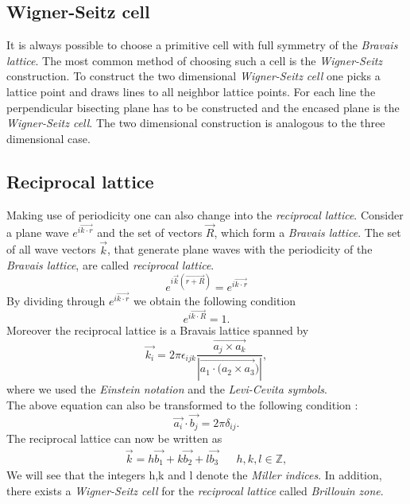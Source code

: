 		\subsection{Wigner-Seitz cell}
			It is always possible to choose a primitive cell with full symmetry of the \textit{Bravais lattice}. The most common method of choosing such a cell is the \textit{Wigner-Seitz} construction. To construct the two dimensional \textit{Wigner-Seitz cell} one picks a lattice point and draws lines to all neighbor lattice points. For each line the perpendicular bisecting plane has to be constructed and the encased plane is the \textit{Wigner-Seitz cell}. The two dimensional construction is analogous to the three dimensional case.			
			
		\subsection{Reciprocal lattice}
			\label{sec:reciprocalLattice}
			Making use of periodicity one can also change into the \textit{reciprocal lattice}. Consider a plane wave $e^{i\vec{k \cdot r}}$ and the set of vectors $\vec{R}$, which form a \textit{Bravais lattice}. The set of all wave vectors $\vec{k}$, that generate plane waves with the periodicity of the \textit{Bravais lattice}, are called \textit{reciprocal lattice}.
			\begin{equation}
				\label{eq:reciprocalLattice}
				e^{i\vec{k}(\vec{r + R})} = e^{i \vec{k \cdot r}}
			\end{equation}
			By dividing through $e^{i\vec{k \cdot r}}$ we obtain the following condition
			\begin{equation}
				e^{i\vec{k \cdot R}} = 1.
			\end{equation}
			Moreover the reciprocal lattice is a Bravais lattice spanned by
			\begin{equation}
				\vec{k_i} = 2 \pi \epsilon_{ijk} \frac{\vec{a_j \times a_k}}{|\vec{a_1 \cdot (a_2 \times a_3})|},
			\end{equation}
			where we used the \textit{Einstein notation} and the \textit{Levi-Cevita symbols}. \\
			The above equation can also be transformed to the following condition :
			\begin{equation}
				\label{eq:reciprocalCondition}
				\vec{a_i} \cdot \vec{b_j} = 2 \pi \delta_{ij}.
			\end{equation}
			The reciprocal lattice can now be written as 
			\begin{align}
				\label{eq:reciprocalLattice2}
				\vec{k} = h\vec{b_1} + k\vec{b_2} + l\vec{b_3} && h,k,l \in \mathbb{Z},
			\end{align}	
			We will see that the integers h,k and l denote the \textit{Miller indices}. In addition, there exists a \textit{Wigner-Seitz cell} for the \textit{reciprocal lattice} called \textit{Brillouin zone}. 	
			
